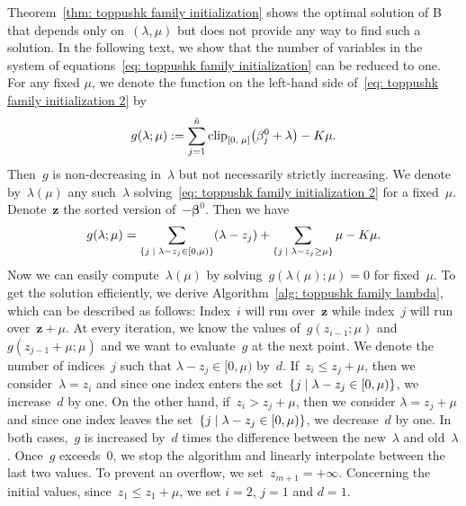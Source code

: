Theorem~\ref{thm: toppushk family initialization} shows the optimal solution of B that depends only on~$(\lambda, \mu)$ but does not provide any way to find such a solution. In the following text, we show that the number of variables in the system of equations~\eqref{eq: toppushk family initialization} can be reduced to one. For any fixed $\mu$, we denote the function on the left-hand side of~\eqref{eq: toppushk family initialization 2} by 
\begin{equation*}
  g(\lambda; \mu) := \sum_{j=1}^{\ntil} \clip{0}{\mu}{\beta_j^0 + \lambda} - K\mu.
\end{equation*}
Then~$g$ is non-decreasing in~$\lambda$ but not necessarily strictly increasing. We denote by~$\lambda(\mu)$ any such~$\lambda$ solving~\eqref{eq: toppushk family initialization 2} for a fixed~$\mu$. Denote~$\bm{z}$ the sorted version of~$-\bm{\beta}^0$. Then we have
\begin{equation*}
  g(\lambda; \mu)
    = \sum_{\Set{j}{\lambda - z_j \in [0, \mu)}}(\lambda - z_j)
    + \sum_{\Set{j}{\lambda - z_j \ge \mu}}\mu - K\mu.
\end{equation*}
Now we can easily compute~$\lambda(\mu)$ by solving~$g(\lambda(\mu); \mu) = 0$ for fixed~$\mu.$ To get the solution efficiently, we derive Algorithm~\ref{alg: toppushk family lambda}, which can  be described as follows: Index~$i$ will run over~$\bm{z}$ while index~$j$ will run over~$\bm{z} + \mu$. At every iteration, we know the values of~$g(z_{i-1}; \mu)$ and~$g(z_{j-1}+\mu; \mu)$ and we want to evaluate~$g$ at the next point. We denote the number of indices~$j$ such that $\lambda - z_j \in[0, \mu)$ by~$d$. If~$z_i \le z_j + \mu$, then we consider~$\lambda = z_i$ and since one index enters the set~$\Set{j}{\lambda - z_j \in [0, \mu)}$, we increase~$d$ by one. On the other hand, if~$z_i > z_j + \mu$, then we consider $\lambda = z_j + \mu$ and since one index leaves the set~$\Set{j}{\lambda - z_j \in [0, \mu)}$, we decrease~$d$ by one. In both cases,~$g$ is increased by~$d$ times the difference between the new~$\lambda$ and old~$\lambda$. Once~$g$ exceeds~$0$, we stop the algorithm and linearly interpolate between the last two values. To prevent an overflow, we set~$z_{m+1} = + \infty$. Concerning the initial values, since~$z_1 \le z_1 + \mu$, we set $i=2$, $j=1$ and $d=1$. 


